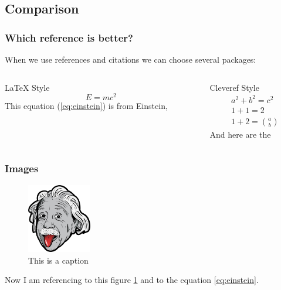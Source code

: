 \documentclass[aspectratio=169]{beamer}
\begin{document}
\subsection{Comparison}
\begin{frame}
    \frametitle{Which reference is better?}

    When we use references and citations we can choose several packages:
    \begin{center}
    \begin{columns}[T]
        \begin{column}{0.5\textwidth}
            LaTeX Style\\
            \begin{equation}
                E = mc^2\label{eq:einstein}
            \end{equation}
            \vfill
            This equation (\ref{eq:einstein}) is from Einstein, \cite{Einstein1919}
        \end{column}
        \begin{column}{0.5\textwidth}
            Cleveref Style\\
            \begin{align}
                a^2 + b^2 = c^2 \label{eq:pythagoras}\\
                1 + 1 = 2 \label{eq:nonsense}\\
                1+2  = \binom{a}{b} \label{eq:3}
            \end{align}
            \vfill
            And here are the          
        \end{column}
    \end{columns}
\end{center}
\end{frame}

\begin{frame}
    \frametitle{Images}

    \begin{figure}[t]
        \centering
        \includegraphics[width=0.25\textwidth]{./img/einstein.png}
        \caption{This is a caption}
        \label{fig:einstein}
    \end{figure}

    Now I am referencing to this figure \ref{fig:einstein} and to the equation \ref{eq:einstein}.

\end{frame}
\end{document}
